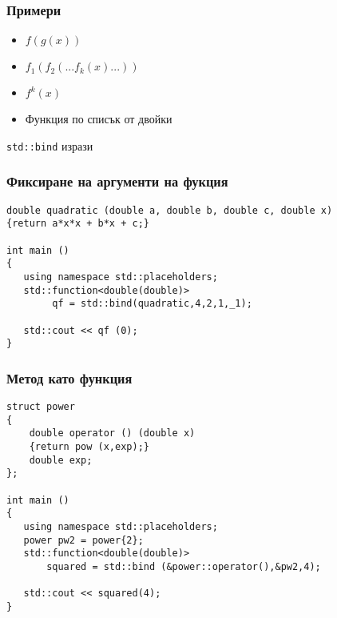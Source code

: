 \documentclass{beamer}
\begin{document}
\begin{frame}[fragile]
    \frametitle{Примери}
    
\begin{itemize} 
    \item $f(g(x))$
    \item $f_1(f_2(...f_k(x)...))$
    \item $f^k(x)$
    \item Функция по списък от двойки
\end{itemize}

\end{frame}

\begin{frame}
    \centerline{\texttt{std::bind} изрази}
\end{frame}


\begin{frame}[fragile]
    \frametitle{Фиксиране на аргументи на фукция}
    
\begin{lstlisting}[basicstyle=\small]
double quadratic (double a, double b, double c, double x)
{return a*x*x + b*x + c;}

int main ()
{
   using namespace std::placeholders; 
   std::function<double(double)> 
        qf = std::bind(quadratic,4,2,1,_1);

   std::cout << qf (0);
}

\end{lstlisting}
\end{frame}


\begin{frame}[fragile]
    \frametitle{Метод като функция}
    
\begin{lstlisting}[basicstyle=\small]
struct power
{
    double operator () (double x)
    {return pow (x,exp);}
    double exp;
};
    
int main ()
{
   using namespace std::placeholders; 
   power pw2 = power{2};
   std::function<double(double)> 
       squared = std::bind (&power::operator(),&pw2,4);

   std::cout << squared(4);
}

\end{lstlisting}
\end{frame}
\end{document}

